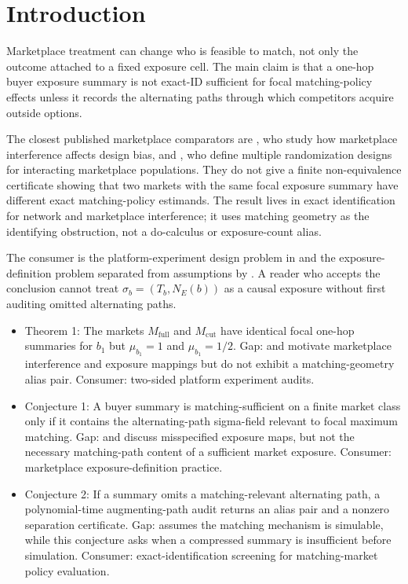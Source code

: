 \documentclass[11pt]{article}
\theoremstyle{definition}
\theoremstyle{plain}
\theoremstyle{remark}
\begin{document}
\section{Introduction}
Marketplace treatment can change who is feasible to match, not only the outcome attached to a fixed exposure cell. The main claim is that a one-hop buyer exposure summary is not exact-ID sufficient for focal matching-policy effects unless it records the alternating paths through which competitors acquire outside options.

The closest published marketplace comparators are \citet[abstract]{JohariLiLiskovichWeintraub2022}, who study how marketplace interference affects design bias, and \citet[Section 2]{MasoeroVijaykumarRichardsonMcQueenRosenBurdickBajariImbens2026}, who define multiple randomization designs for interacting marketplace populations. They do not give a finite non-equivalence certificate showing that two markets with the same focal exposure summary have different exact matching-policy estimands. The result lives in exact identification for network and marketplace interference; it uses matching geometry as the identifying obstruction, not a do-calculus or exposure-count alias.

The consumer is the platform-experiment design problem in \citet{JohariLiLiskovichWeintraub2022} and the exposure-definition problem separated from assumptions by \citet{Savje2024}. A reader who accepts the conclusion cannot treat $\sigma_b=(T_b,N_E(b))$ as a causal exposure without first auditing omitted alternating paths.

\begin{itemize}[leftmargin=*]
\item Theorem 1: The markets $M_{\mathrm{full}}$ and $M_{\mathrm{cut}}$ have identical focal one-hop summaries for $b_1$ but $\mu_{b_1}=1$ and $\mu_{b_1}=1/2$. Gap: \citet{JohariLiLiskovichWeintraub2022} and \citet{AronowSamii2017} motivate marketplace interference and exposure mappings but do not exhibit a matching-geometry alias pair. Consumer: two-sided platform experiment audits.
\item Conjecture 1: A buyer summary is matching-sufficient on a finite market class only if it contains the alternating-path sigma-field relevant to focal maximum matching. Gap: \citet{Savje2024} and \citet{AronowSamii2017} discuss misspecified exposure maps, but not the necessary matching-path content of a sufficient market exposure. Consumer: marketplace exposure-definition practice.
\item Conjecture 2: If a summary omits a matching-relevant alternating path, a polynomial-time augmenting-path audit returns an alias pair and a nonzero separation certificate. Gap: \citet{Chen2019} assumes the matching mechanism is simulable, while this conjecture asks when a compressed summary is insufficient before simulation. Consumer: exact-identification screening for matching-market policy evaluation.
\end{itemize}
\end{document}
